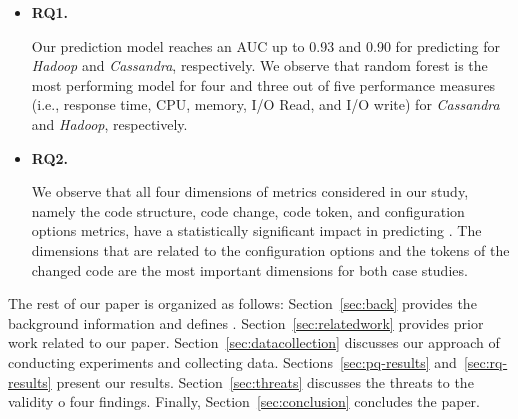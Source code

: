 \begin{itemize}
    
    \item \textbf{RQ1. \RQII}
    
    Our prediction model reaches an AUC up to 0.93 and 0.90 for predicting \inconsistent for \emph{Hadoop} and \emph{Cassandra}, respectively. We observe that random forest is the most performing model for four and three out of five performance measures (i.e., response time, CPU, memory, I/O Read, and I/O write) for \emph{Cassandra} and \emph{Hadoop}, respectively. 
    
    \item\textbf{RQ2. \RQIII}
    
    We observe that all four dimensions of metrics considered in our study, namely the code structure, code change, code token, and configuration options metrics, have a statistically significant impact in predicting \inconsistent. The dimensions that are related to the configuration options and the tokens of the changed code are the most important dimensions for both case studies. 
    
\end{itemize}

 The rest of our paper is organized as follows: Section~\ref{sec:back} provides the background information and defines \inconsistent. Section~\ref{sec:relatedwork} provides prior work related to our paper. Section~\ref{sec:datacollection} discusses our approach of conducting experiments and collecting data. Sections~\ref{sec:pq-results} and~\ref{sec:rq-results} present our results. Section~\ref{sec:threats} discusses the threats to the validity o four findings. Finally, Section~\ref{sec:conclusion} concludes the paper.


